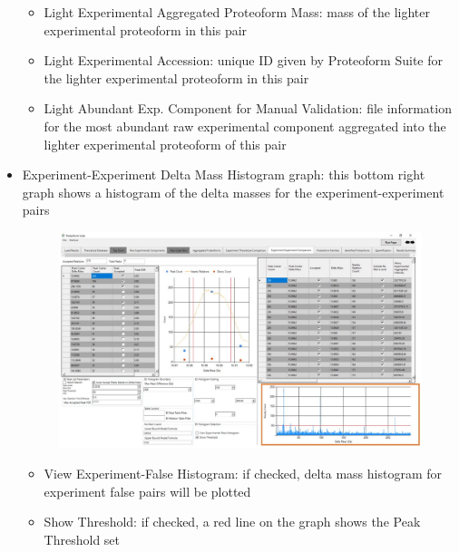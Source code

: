 \begin{itemize}
\begin{itemize}
	\item Light Experimental Aggregated Proteoform Mass: mass of the lighter experimental proteoform in this pair
	\item Light Experimental Accession: unique ID given by Proteoform Suite for the lighter experimental proteoform in this pair		
	\item Light Abundant Exp. Component for Manual Validation: file information for the most abundant raw experimental component aggregated into the lighter experimental proteoform of this pair
\end{itemize}
\item Experiment-Experiment Delta Mass Histogram graph: this bottom right graph shows a histogram of the delta masses for the experiment-experiment pairs
\begin{figure}[h]
\centering
\includegraphics[scale=0.46]{figures/ee5.jpg}
\end{figure}
\begin{itemize} 
	\item View Experiment-False Histogram: if checked, delta mass histogram for experiment false pairs will be plotted
	\item Show Threshold: if checked, a red line on the graph shows the Peak Threshold set
	\end{itemize}
\end{itemize}